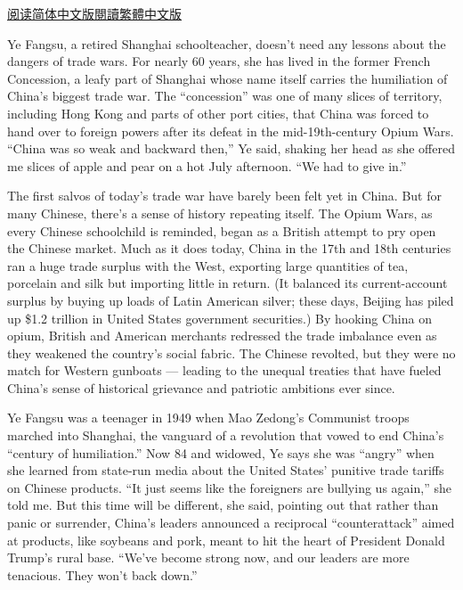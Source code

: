 \href{https://cn.nytimes3xbfgragh.onion/business/20180808/when-it-comes-to-a-trade-war-china-takes-the-long-view/}{阅读简体中文版}\href{https://cn.nytimes3xbfgragh.onion/business/20180808/when-it-comes-to-a-trade-war-china-takes-the-long-view/zh-hant/}{閱讀繁體中文版}

Ye Fangsu, a retired Shanghai schoolteacher, doesn't need any lessons
about the dangers of trade wars. For nearly 60 years, she has lived in
the former French Concession, a leafy part of Shanghai whose name itself
carries the humiliation of China's biggest trade war. The ``concession''
was one of many slices of territory, including Hong Kong and parts of
other port cities, that China was forced to hand over to foreign powers
after its defeat in the mid-19th-century Opium Wars. ``China was so weak
and backward then,'' Ye said, shaking her head as she offered me slices
of apple and pear on a hot July afternoon. ``We had to give in.''

The first salvos of today's trade war have barely been felt yet in
China. But for many Chinese, there's a sense of history repeating
itself. The Opium Wars, as every Chinese schoolchild is reminded, began
as a British attempt to pry open the Chinese market. Much as it does
today, China in the 17th and 18th centuries ran a huge trade surplus
with the West, exporting large quantities of tea, porcelain and silk but
importing little in return. (It balanced its current-account surplus by
buying up loads of Latin American silver; these days, Beijing has piled
up \$1.2 trillion in United States government securities.) By hooking
China on opium, British and American merchants redressed the trade
imbalance even as they weakened the country's social fabric. The Chinese
revolted, but they were no match for Western gunboats --- leading to the
unequal treaties that have fueled China's sense of historical grievance
and patriotic ambitions ever since.

Ye Fangsu was a teenager in 1949 when Mao Zedong's Communist troops
marched into Shanghai, the vanguard of a revolution that vowed to end
China's ``century of humiliation.'' Now 84 and widowed, Ye says she was
``angry'' when she learned from state-run media about the United States'
punitive trade tariffs on Chinese products. ``It just seems like the
foreigners are bullying us again,'' she told me. But this time will be
different, she said, pointing out that rather than panic or surrender,
China's leaders announced a reciprocal ``counterattack'' aimed at
products, like soybeans and pork, meant to hit the heart of President
Donald Trump's rural base. ``We've become strong now, and our leaders
are more tenacious. They won't back down.''

